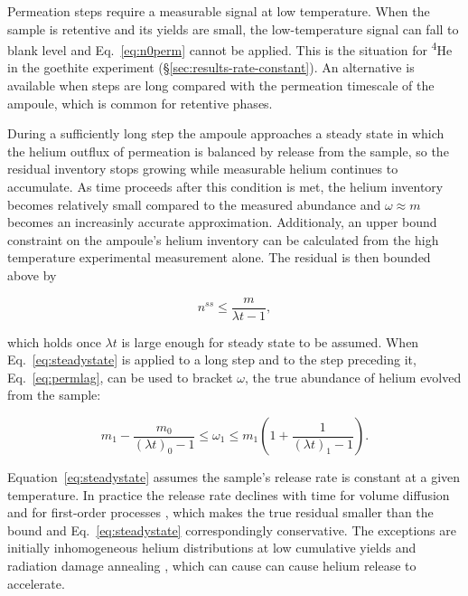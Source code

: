 Permeation steps require a measurable signal at low temperature. When the sample is retentive and its yields are small, the low-temperature signal can fall to blank level and Eq.~\eqref{eq:n0perm} cannot be applied. This is the situation for \textsuperscript{4}He in the goethite experiment (\S\ref{sec:results-rate-constant}). An alternative is available when steps are long compared with the permeation timescale of the ampoule, which is common for retentive phases.

During a sufficiently long step the ampoule approaches a steady state in which the helium outflux of permeation is balanced by release from the sample, so the residual inventory stops growing while measurable helium continues to accumulate. As time proceeds after this condition is met, the helium inventory becomes relatively small compared to the measured abundance and $\omega \approx m$ becomes an increasinly accurate approximation. Additionaly, an upper bound constraint on the ampoule's helium inventory can be calculated from the high temperature experimental measurement alone. The residual is then bounded above by

\begin{equation}
\label{eq:steadystate}
n^{ss} \leq \frac{m}{\lambda t - 1} ,
\end{equation}

which holds once $\lambda t$ is large enough for steady state to be assumed. When Eq.~\eqref{eq:steadystate} is applied to a long step and to the step preceding it, Eq.~\eqref{eq:permlag}, can be used to bracket $\omega$, the true abundance of helium evolved from the sample:

\begin{equation}
\label{eq:bound}
m_{1} - \frac{m_{0}}{(\lambda t)_{0} - 1} \leq \omega_{1} \leq m_{1}\left(1 + \frac{1}{(\lambda t)_{1} - 1}\right) .
\end{equation}

Equation~\eqref{eq:steadystate} assumes the sample's release rate is constant at a given temperature. In practice the release rate declines with time for volume diffusion \citep{wolf1996,reinersfarley1999,farleymckeon2015,farley2018,farley2024} and for first-order processes \citep{yakubovich2010,wilson1973}, which makes the true residual smaller than the bound and Eq.~\eqref{eq:steadystate} correspondingly conservative. The exceptions are initially inhomogeneous helium distributions at low cumulative yields \citep{goldsmith2020,ketcham2011,shuster2004,farley1996} and radiation damage annealing \citep{cherniak2019,guenthner2013,flowers2007,flowers2009,shuster2006}, which can cause can cause helium release to accelerate.


